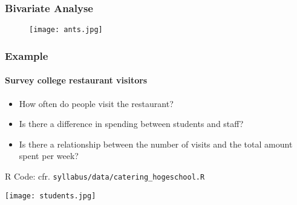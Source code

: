 \documentclass[aspectratio=169]{beamer}
\begin{document}
\begin{frame}
  \frametitle{Bivariate Analyse}
  \begin{figure}
    \centering
    \texttt{[image: ants.jpg]}
    \label{fig:ants}
  \end{figure}
  
\end{frame}

\begin{frame}
  \frametitle{Example}
  \framesubtitle{Survey college restaurant visitors}
  
  \begin{itemize}
    \item How often do people visit the restaurant?
    \item Is there a difference in spending between students and staff?
    \item Is there a relationship between the number of visits and the total amount spent per week?
  \end{itemize}
  
  R Code: cfr. \texttt{syllabus/data/catering\_hogeschool.R}
  
  \centering
  \texttt{[image: students.jpg]}
\end{frame}
\end{document}
